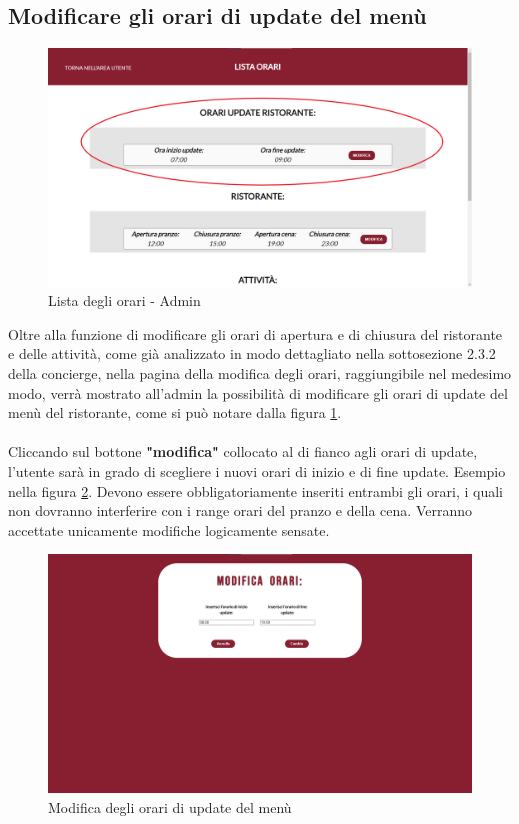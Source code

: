 \documentclass [a4paper, 12pt]{book}
\begin{document}
\subsection{Modificare gli orari di update del menù}
\begin{figure}[h]
\centering
\includegraphics[scale=0.3]{ListaOrariAdmin.png}
\caption{Lista degli orari - Admin}
\label{ListaOrariAdmin}
\end{figure}
Oltre alla funzione di modificare gli orari di apertura e di chiusura del ristorante e delle attività, come già analizzato in modo dettagliato nella sottosezione 2.3.2 della concierge, nella pagina della modifica degli orari, raggiungibile nel medesimo modo, verrà mostrato all'admin la possibilità di modificare gli orari di update del menù del ristorante, come si può notare dalla figura \ref{ListaOrariAdmin}.\\\\ 
Cliccando sul bottone \textbf{"modifica"} collocato al di fianco agli orari di update, l'utente sarà in grado di scegliere i nuovi orari di inizio e di fine update. Esempio nella figura \ref{ModificaOrariUpdate}. Devono essere obbligatoriamente inseriti entrambi gli orari, i quali non dovranno interferire con i range orari del pranzo e della cena. Verranno accettate unicamente modifiche logicamente sensate. 
\begin{figure}[h]
\centering
\includegraphics[scale=0.3]{ModificaOrariUpdate.png}
\caption{Modifica degli orari di update del menù}
\label{ModificaOrariUpdate}
\end{figure}
\end{document}
